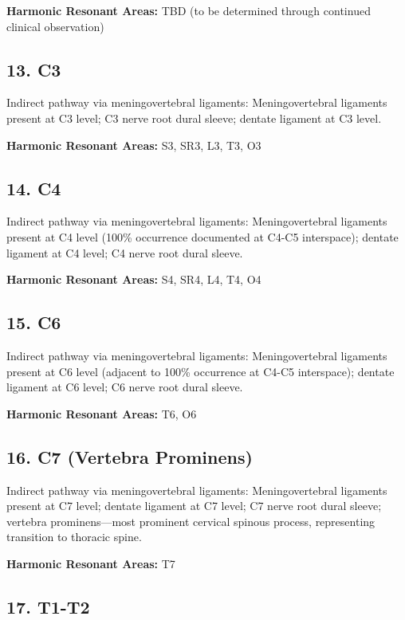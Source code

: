 \documentclass[11pt,letterpaper]{article}
\begin{document}
\textbf{Harmonic Resonant Areas:} TBD (to be determined through continued clinical observation)


\subsection{13. C3}

Indirect pathway via meningovertebral ligaments: Meningovertebral ligaments present at C3 level; C3 nerve root dural sleeve; dentate ligament at C3 level.


\textbf{Harmonic Resonant Areas:} S3, SR3, L3, T3, O3


\subsection{14. C4}

Indirect pathway via meningovertebral ligaments: Meningovertebral ligaments present at C4 level (100\% occurrence documented at C4-C5 interspace); dentate ligament at C4 level; C4 nerve root dural sleeve.


\textbf{Harmonic Resonant Areas:} S4, SR4, L4, T4, O4


\subsection{15. C6}

Indirect pathway via meningovertebral ligaments: Meningovertebral ligaments present at C6 level (adjacent to 100\% occurrence at C4-C5 interspace); dentate ligament at C6 level; C6 nerve root dural sleeve.


\textbf{Harmonic Resonant Areas:} T6, O6


\subsection{16. C7 (Vertebra Prominens)}

Indirect pathway via meningovertebral ligaments: Meningovertebral ligaments present at C7 level; dentate ligament at C7 level; C7 nerve root dural sleeve; vertebra prominens—most prominent cervical spinous process, representing transition to thoracic spine.


\textbf{Harmonic Resonant Areas:} T7


\subsection{17. T1-T2}
\end{document}
